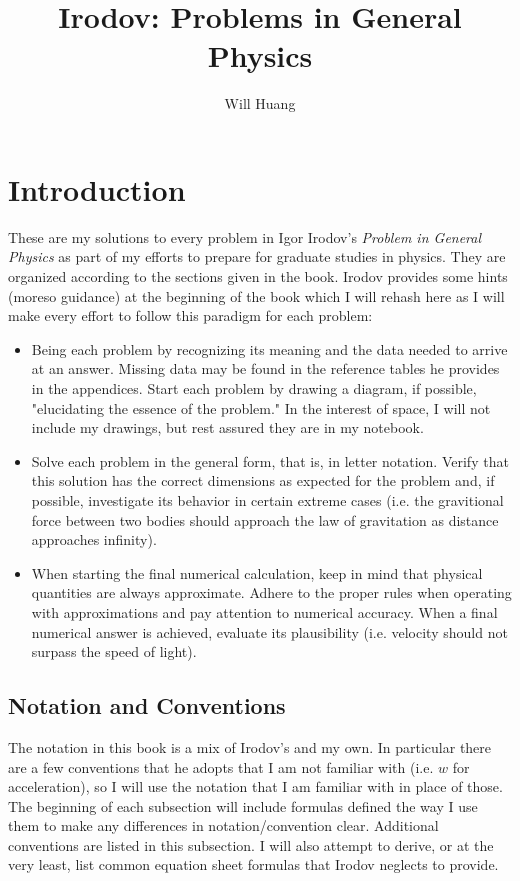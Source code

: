 \documentclass[12pt]{article}
\begin{document}
\title{Irodov: Problems in General Physics}
\author{Will Huang}
\maketitle
\tableofcontents

\newpage 

\section{Introduction}
These are my solutions to every problem in Igor Irodov's \emph{Problem in General Physics} as part of my efforts to prepare for graduate studies in physics. They are organized according to the sections given in the book. Irodov provides some hints (moreso guidance) at the beginning of the book which I will rehash here as I will make every effort to follow this paradigm for each problem:
\begin{itemize}
	\item Being each problem by recognizing its meaning and the data needed to arrive at an answer. Missing data may be found in the reference tables he provides in the appendices. Start each problem by drawing a diagram, if possible, "elucidating the essence of the problem." In the interest of space, I will not include my drawings, but rest assured they are in my notebook.
	\item Solve each problem in the general form, that is, in letter notation. Verify that this solution has the correct dimensions as expected for the problem and, if possible, investigate its behavior in certain extreme cases (i.e. the gravitional force between two bodies should approach the law of gravitation as distance approaches infinity).
	\item When starting the final numerical calculation, keep in mind that physical quantities are always approximate. Adhere to the proper rules when operating with approximations and pay attention to numerical accuracy. When a final numerical answer is achieved, evaluate its plausibility (i.e. velocity should not surpass the speed of light).
\end{itemize}

\subsection{Notation and Conventions}
The notation in this book is a mix of Irodov's and my own. In particular there are a few conventions that he adopts that I am not familiar with (i.e. $w$ for acceleration), so I will use the notation that I am familiar with in place of those. The beginning of each subsection will include formulas defined the way I use them to make any differences in notation/convention clear. Additional conventions are listed in this subsection. I will also attempt to derive, or at the very least, list common equation sheet formulas that Irodov neglects to provide.
\end{document}
